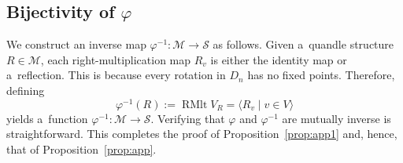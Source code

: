 \documentclass{jonasart}
\DeclareMathOperator{\RMlt}{RMlt}
\newcommand{\inv}{^{-1}}
\begin{document}
	\subsection{Bijectivity of $\varphi$}
    
	We construct an inverse map $\varphi\inv:\mathcal{M}\to\mathcal{S}$ as follows. Given a~quandle structure $R\in\mathcal{M}$, each right-multiplication map $R_v$ is either the identity map or a~reflection. This is because every rotation in $D_n$ has no fixed points. Therefore, defining
	\[
		\varphi\inv(R):=\RMlt V_R=\langle R_v\mid v\in V\rangle
	\]
	yields a~function $\varphi\inv:\mathcal{M}\to\mathcal{S}$. Verifying that $\varphi$ and $\varphi\inv$ are mutually inverse is straightforward. This completes the proof of Proposition~\ref{prop:app1} and, hence, that of Proposition~\ref{prop:app}.
\end{document}
